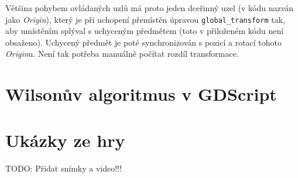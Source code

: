 \documentclass[12pt]{report}
\begin{document}
Většina pohybem ovládaných uzlů má proto jeden dceřinný uzel (v kódu nazván jako \textit{Origin}), který je při uchopení přemístěn úpravou \texttt{global\_transform} tak, aby umístěním splýval s uchyceným předmětem (toto v přiloženém kódu není obsaženo). Uchycený předmět je poté synchronizován s pozicí a rotací tohoto \textit{Origin}u. Není tak potřeba manuálně počítat rozdíl transformace.



\chapter{Wilsonův algoritmus v GDScript}\label{apx_mazegen}


\chapter{Ukázky ze hry}
TODO: Přidat snímky a video!!!
\end{document}
